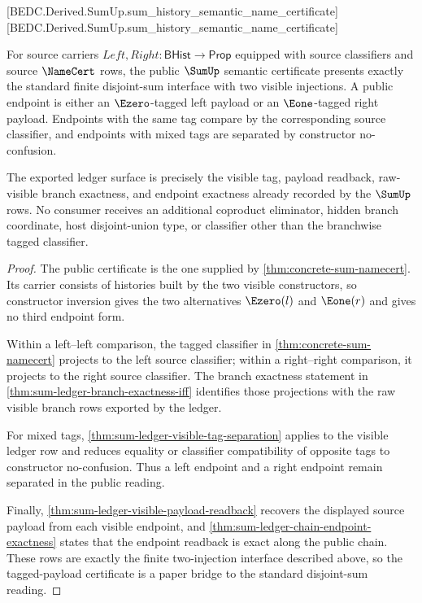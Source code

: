 [BEDC.Derived.SumUp.sum\_history\_semantic\_name\_certificate]
[BEDC.Derived.SumUp.sum\_history\_semantic\_name\_certificate]

\begin{theorem}\label{thm:sum-public-tagged-payload-standard-bridge}
For source carriers $Left,Right : \mathsf{BHist}\to\mathsf{Prop}$ equipped with source classifiers and source $\NameCert$ rows, the public $\SumUp$ semantic certificate presents exactly the standard finite disjoint-sum interface with two visible injections. A public endpoint is either an $\Ezero$-tagged left payload or an $\Eone$-tagged right payload. Endpoints with the same tag compare by the corresponding source classifier, and endpoints with mixed tags are separated by constructor no-confusion.

The exported ledger surface is precisely the visible tag, payload readback, raw-visible branch exactness, and endpoint exactness already recorded by the $\SumUp$ rows. No consumer receives an additional coproduct eliminator, hidden branch coordinate, host disjoint-union type, or classifier other than the branchwise tagged classifier.
\end{theorem}
\begin{proof}
The public certificate is the one supplied by \autoref{thm:concrete-sum-namecert}. Its carrier consists of histories built by the two visible constructors, so constructor inversion gives the two alternatives $\Ezero(l)$ and $\Eone(r)$ and gives no third endpoint form.

Within a left--left comparison, the tagged classifier in \autoref{thm:concrete-sum-namecert} projects to the left source classifier; within a right--right comparison, it projects to the right source classifier. The branch exactness statement in \autoref{thm:sum-ledger-branch-exactness-iff} identifies those projections with the raw visible branch rows exported by the ledger.

For mixed tags, \autoref{thm:sum-ledger-visible-tag-separation} applies to the visible ledger row and reduces equality or classifier compatibility of opposite tags to constructor no-confusion. Thus a left endpoint and a right endpoint remain separated in the public reading.

Finally, \autoref{thm:sum-ledger-visible-payload-readback} recovers the displayed source payload from each visible endpoint, and \autoref{thm:sum-ledger-chain-endpoint-exactness} states that the endpoint readback is exact along the public chain. These rows are exactly the finite two-injection interface described above, so the tagged-payload certificate is a paper bridge to the standard disjoint-sum reading.
\end{proof}

